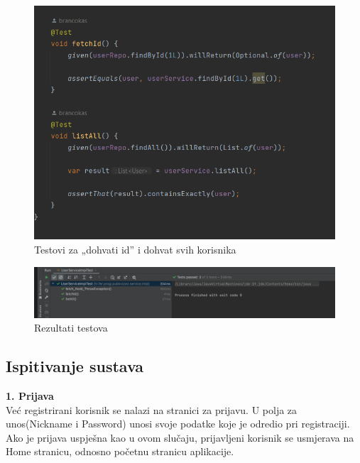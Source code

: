 				\begin{figure}[H]
					\includegraphics[width=\textwidth]{slike/UserServiceImplTest2.PNG} 
					\caption{Testovi za „dohvati id” i dohvat svih korisnika}
					\label{fig:UserServiceImplTest2}
				\end{figure}
				
				\begin{figure}[H]
					\includegraphics[width=\textwidth]{slike/UserServiceImplTestRez.PNG} 
					\caption{Rezultati testova}
					\label{fig:UserServiceImplTestRez}
				\end{figure}
								
			\eject
			
			\subsection{Ispitivanje sustava}
			 
			\textbf{1. Prijava}\\
				
				Već registrirani korisnik se nalazi na stranici za prijavu. U polja za unos(Nickname i Password) unosi svoje podatke koje je odredio pri registraciji. Ako je prijava uspješna kao u ovom slučaju, prijavljeni korisnik se usmjerava na Home stranicu, odnosno početnu stranicu aplikacije.
				
